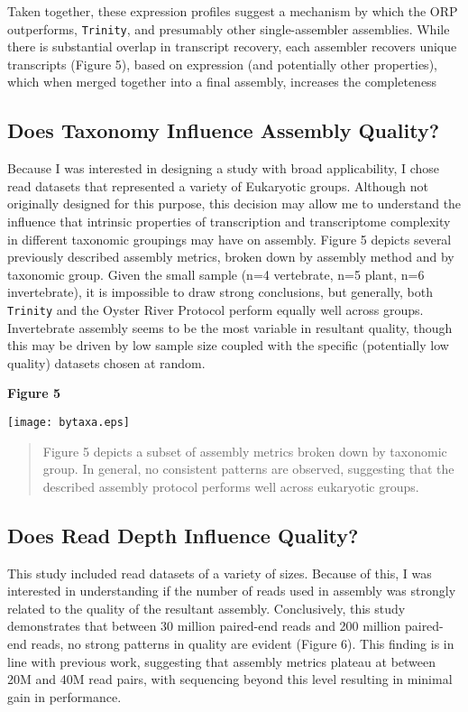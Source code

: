 \documentclass[10pt,letterpaper]{article}
\begin{document}
Taken together, these expression profiles suggest a mechanism by which the ORP outperforms, \texttt{Trinity}, and presumably other single-assembler assemblies. While there is substantial overlap in transcript recovery, each assembler recovers unique transcripts (Figure 5), based on expression (and potentially other properties), which when merged together into a final assembly, increases the completeness 

\subsection{Does Taxonomy Influence Assembly Quality?}

Because I was interested in designing a study with broad applicability, I chose read datasets that represented a variety of Eukaryotic groups. Although not originally designed for this purpose, this decision may allow me to understand the influence that intrinsic properties of transcription and transcriptome complexity in different taxonomic groupings may have on assembly. Figure 5 depicts several previously described assembly metrics, broken down by assembly method and by taxonomic group. Given the small sample (n=4 vertebrate, n=5 plant, n=6 invertebrate), it is impossible to draw strong conclusions, but generally, both \texttt{Trinity} and the Oyster River Protocol perform equally well across groups. Invertebrate assembly seems to be the most variable in resultant quality, though this may be driven by low sample size coupled with the specific (potentially low quality) datasets chosen at random. 

\textbf{\hypertarget{Figure 5}{Figure 5}} \\
\centerline{\texttt{[image: bytaxa.eps]}}
\begin{quote}
\small{Figure 5 depicts a subset of assembly metrics broken down by taxonomic group. In general, no consistent patterns are observed, suggesting that the described assembly protocol performs well across eukaryotic groups.}
\end{quote} 


\subsection{Does Read Depth Influence Quality?}

This study included read datasets of a variety of sizes. Because of this, I was interested in understanding if the number of reads used in assembly was strongly related to the quality of the resultant assembly. Conclusively, this study demonstrates that between 30 million paired-end reads and 200 million paired-end reads, no strong patterns in quality are evident (Figure 6). This finding is in line with previous work, \citep{MacManes:2015iz} suggesting that assembly metrics plateau at between 20M and 40M read pairs, with sequencing beyond this level resulting in minimal gain in performance.  
\end{document}
